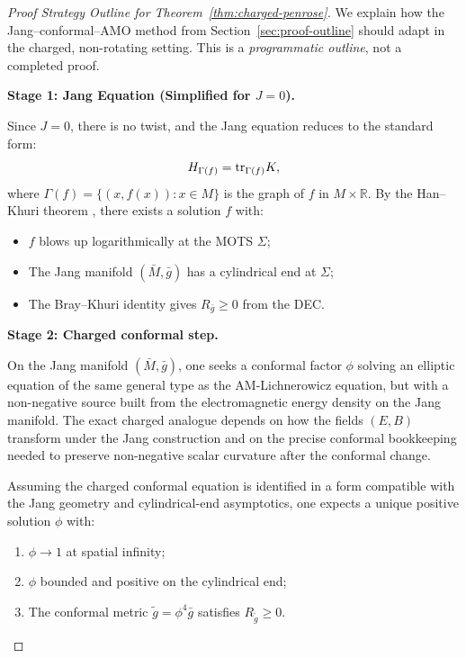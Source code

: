 \begin{proof}[Proof Strategy Outline for Theorem~\ref{thm:charged-penrose}]
We explain how the Jang--conformal--AMO method from Section~\ref{sec:proof-outline} should adapt in the charged, non-rotating setting. This is a \emph{programmatic outline}, not a completed proof.

\textbf{Stage 1: Jang Equation (Simplified for $J = 0$).}

Since $J = 0$, there is no twist, and the Jang equation reduces to the standard form:
\begin{equation}
    H_{\Gamma(f)} = \mathrm{tr}_{\Gamma(f)} K,
\end{equation}
where $\Gamma(f) = \{(x, f(x)) : x \in M\}$ is the graph of $f$ in $M \times \mathbb{R}$. By the Han--Khuri theorem \cite{hankhuri2013}, there exists a solution $f$ with:
\begin{itemize}
    \item $f$ blows up logarithmically at the MOTS $\Sigma$;
    \item The Jang manifold $(\bar{M}, \bar{g})$ has a cylindrical end at $\Sigma$;
    \item The Bray--Khuri identity gives $R_{\bar{g}} \geq 0$ from the DEC.
\end{itemize}

\textbf{Stage 2: Charged conformal step.}

On the Jang manifold $(\bar{M}, \bar{g})$, one seeks a conformal factor $\phi$ solving an elliptic equation of the same general type as the AM-Lichnerowicz equation, but with a non-negative source built from the electromagnetic energy density on the Jang manifold. The exact charged analogue depends on how the fields $(E,B)$ transform under the Jang construction and on the precise conformal bookkeeping needed to preserve non-negative scalar curvature after the conformal change.

\begin{lemma}\label{lem:lich-charged-exist}
Assuming the charged conformal equation is identified in a form compatible with the Jang geometry and cylindrical-end asymptotics, one expects a unique positive solution $\phi$ with:
\begin{enumerate}[label=(\roman*)]
    \item $\phi \to 1$ at spatial infinity;
    \item $\phi$ bounded and positive on the cylindrical end;
    \item The conformal metric $\tilde{g} = \phi^4 \bar{g}$ satisfies $R_{\tilde{g}} \geq 0$.
\end{enumerate}
\end{lemma}


\end{proof}
